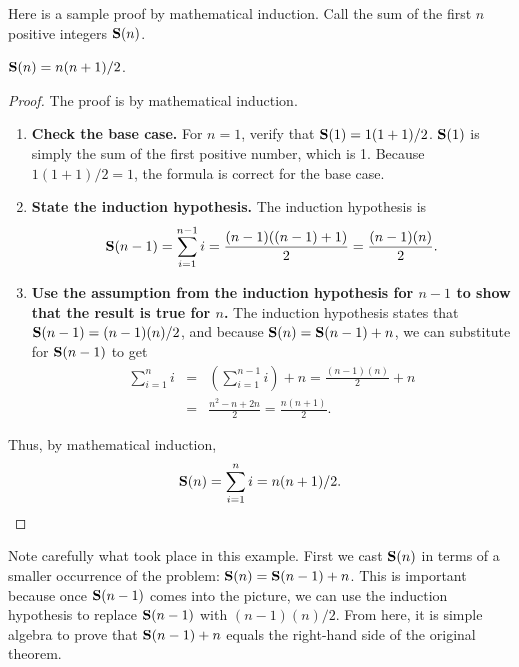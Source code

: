 \begin{example}
\label{SumIEx}
Here is a sample proof by mathematical induction.
Call the sum of the first \(n\) positive integers \(\mbox{$\textbf{S}(n)$}\).
\medskip

\begin{theorem}
\(\mbox{$\textbf{S}(n)$} = n(n+1)/2\).
\end{theorem}

\begin{proof}
The proof is by mathematical induction.

\begin{enumerate}

\item
\textbf{Check the base case.}
For \(n = 1\), verify that \(\mbox{$\textbf{S}(1)$} = 1(1+1)/2\).
\(\mbox{$\textbf{S}(1)$}\) is simply the sum of the first positive number, which is 1.
Because \(1(1+1)/2 = 1\), the formula is correct for the base case.

\item
\textbf{State the induction hypothesis.}
The induction hypothesis is
\[ \mbox{$\textbf{S}(n-1)$} = \sum_{i=1}^{n-1} i =
\frac{(n-1)((n-1)+1)}{2} = \frac{(n-1)(n)}{2}. \]

\item
\textbf{Use the assumption from the induction hypothesis for
\mbox{\boldmath\(n-1\)} to show that the result is true for
{\boldmath\(n\)}.}
The induction hypothesis states that
\( \mbox{$\textbf{S}(n-1)$} =  (n-1)(n)/2\),
and because \( \mbox{$\textbf{S}(n)$} = \mbox{$\textbf{S}(n-1)$} + n \),
we can substitute for \(\mbox{$\textbf{S}(n-1)$}\) to get
\begin{eqnarray*}
\sum_{i=1}^n i &=& \left(\sum_{i=1}^{n-1} i\right) + n
= \frac{(n-1)(n)}{2} + n\\
&=&\frac{n^2 - n + 2n}{2} = \frac{n(n+1)}{2}.
\end{eqnarray*}
\end{enumerate}

Thus, by mathematical induction,
\[\mbox{$\textbf{S}(n)$} = \sum_{i=1}^n i = n(n+1)/2.\]
\end{proof}
\end{example}

Note carefully what took place in this example.
First we cast \(\mbox{$\textbf{S}(n)$}\) in terms of a smaller occurrence of the problem:
\(\mbox{$\textbf{S}(n)$} = \mbox{$\textbf{S}(n-1)$} + n\).
This is important because once \(\mbox{$\textbf{S}(n-1)$}\) comes into the picture, we
can  use the induction hypothesis to replace \(\mbox{$\textbf{S}(n-1)$}\) with
\((n-1)(n)/2\).
From here, it is simple algebra to prove that \(\mbox{$\textbf{S}(n-1)$} + n\) equals the
right-hand side of the original theorem.

